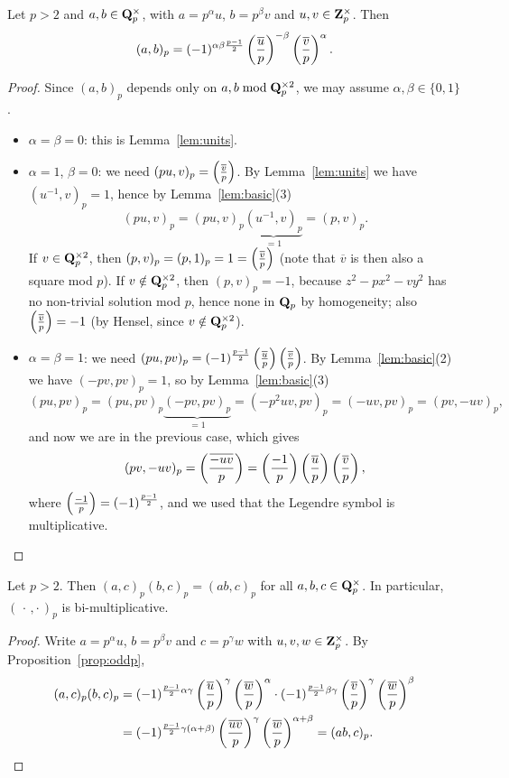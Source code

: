 \documentclass{article}
\begin{document}
\begin{prop}\label{prop:oddp}
	Let $p>2$ and $a,b\in\mathbf{Q}_p^\times$, with $a=p^\alpha u$, $b=p^\beta v$ and $u,v\in\mathbf{Z}_p^\times$. Then
	\[
		(a,b)_p = (-1)^{\alpha\beta\frac{p-1}{2}}\left(\frac{\overline{u}}{p}\right)^{-\beta}\left(\frac{\overline{v}}{p}\right)^{\alpha}.
	\]
\end{prop}
\begin{proof}
	Since $(a,b)_p$ depends only on $a,b \bmod \mathbf{Q}_p^{\times 2}$, we may assume $\alpha,\beta\in\{0,1\}$.
	\begin{itemize}
		\item $\alpha=\beta=0$: this is Lemma~\ref{lem:units}.
		\item $\alpha=1$, $\beta=0$: we need $(pu,v)_p=\left(\frac{\overline{v}}{p}\right)$. By Lemma~\ref{lem:units} we have $(u^{-1},v)_p=1$, hence by Lemma~\ref{lem:basic}(3)
		      \[
			      (pu,v)_p = (pu,v)_p\underbrace{(u^{-1},v)_p}_{=1} = (p,v)_p.
		      \]
		      If $v\in\mathbf{Q}_p^{\times 2}$, then $(p,v)_p=(p,1)_p=1=\left(\frac{\overline{v}}{p}\right)$ (note that $\overline{v}$ is then also a square mod $p$).
		      If $v\notin\mathbf{Q}_p^{\times 2}$, then $(p,v)_p=-1$, because $z^2-px^2-vy^2$ has no non-trivial solution mod $p$, hence none in $\mathbf{Q}_p$ by homogeneity; also $\left(\frac{\overline{v}}{p}\right)=-1$ (by Hensel, since $v\notin\mathbf{Q}_p^{\times 2}$).
		\item $\alpha=\beta=1$: we need $(pu,pv)_p=(-1)^{\frac{p-1}{2}}\left(\frac{\overline{u}}{p}\right)\left(\frac{\overline{v}}{p}\right)$. By Lemma~\ref{lem:basic}(2) we have $(-pv,pv)_p=1$, so by Lemma~\ref{lem:basic}(3)
		      \[
			      (pu,pv)_p = (pu,pv)_p\underbrace{(-pv,pv)_p}_{=1} = (-p^2uv,pv)_p = (-uv,pv)_p = (pv,-uv)_p,
		      \]
		      and now we are in the previous case, which gives
		      \[
			      (pv,-uv)_p = \left(\frac{\overline{-uv}}{p}\right) = \left(\frac{-1}{p}\right)\left(\frac{\overline{u}}{p}\right)\left(\frac{\overline{v}}{p}\right),
		      \]
		      where $\left(\frac{-1}{p}\right)=(-1)^{\frac{p-1}{2}}$, and we used that the Legendre symbol is multiplicative.\qedhere
	\end{itemize}
\end{proof}

\begin{cor}
	Let $p>2$. Then $(a,c)_p(b,c)_p=(ab,c)_p$ for all $a,b,c\in\mathbf{Q}_p^\times$. In particular, $(\,\cdot\,,\cdot\,)_p$ is bi-multiplicative.
\end{cor}
\begin{proof}
	Write $a=p^\alpha u$, $b=p^\beta v$ and $c=p^\gamma w$ with $u,v,w\in\mathbf{Z}_p^\times$. By Proposition~\ref{prop:oddp},
	\begin{align*}
		(a,c)_p(b,c)_p
		 & = (-1)^{\frac{p-1}{2}\alpha\gamma}\left(\frac{\overline{u}}{p}\right)^{\gamma}\left(\frac{\overline{w}}{p}\right)^{\alpha}\cdot(-1)^{\frac{p-1}{2}\beta\gamma}\left(\frac{\overline{v}}{p}\right)^{\gamma}\left(\frac{\overline{w}}{p}\right)^{\beta} \\
		 & = (-1)^{\frac{p-1}{2}\gamma(\alpha+\beta)}\left(\frac{\overline{uv}}{p}\right)^{\gamma}\left(\frac{\overline{w}}{p}\right)^{\alpha+\beta} = (ab,c)_p.\qedhere
	\end{align*}
\end{proof}
\end{document}
